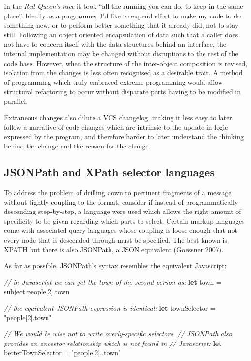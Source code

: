 \documentclass[12pt, ]{article}
\newenvironment{Shaded}{}{}
\newcommand{\KeywordTok}[1]{\textcolor[rgb]{0.00,0.44,0.13}{\textbf{{#1}}}}
\newcommand{\DecValTok}[1]{\textcolor[rgb]{0.25,0.63,0.44}{{#1}}}
\newcommand{\StringTok}[1]{\textcolor[rgb]{0.25,0.44,0.63}{{#1}}}
\newcommand{\CommentTok}[1]{\textcolor[rgb]{0.38,0.63,0.69}{\textit{{#1}}}}
\newcommand{\OtherTok}[1]{\textcolor[rgb]{0.00,0.44,0.13}{{#1}}}
\newcommand{\FunctionTok}[1]{\textcolor[rgb]{0.02,0.16,0.49}{{#1}}}
\newcommand{\NormalTok}[1]{{#1}}
\begin{document}
In the \emph{Red Queen's race} it took ``all the running you can do, to
keep in the same place''. Ideally as a programmer I'd like to expend
effort to make my code to do something new, or to perform better
something that it already did, not to stay still. Following an object
oriented encapsulation of data such that a caller does not have to
concern itself with the data structures behind an interface, the
internal implementation may be changed without disruptions to the rest
of the code base. However, when the structure of the inter-object
composition is revised, isolation from the changes is less often
recognised as a desirable trait. A method of programming which truly
embraced extreme programming would allow structural refactoring to occur
without disparate parts having to be modified in parallel.

Extraneous changes also dilute a VCS changelog, making it less easy to
later follow a narrative of code changes which are intrinsic to the
update in logic expressed by the program, and therefore harder to later
understand the thinking behind the change and the reason for the change.

\subsection{JSONPath and XPath selector
languages}\label{jsonpath-and-xpath-selector-languages}

\label{jsonpathxpath}

To address the problem of drilling down to pertinent fragments of a
message without tightly coupling to the format, consider if instead of
programmatically descending step-by-step, a language were used which
allows the right amount of specificity to be given regarding which parts
to select. Certain markup languages come with associated query languages
whose coupling is loose enough that not every node that is descended
through must be specified. The best known is XPATH but there is also
JSONPath, a JSON equivalent (Goessner 2007).

As far as possible, JSONPath's syntax resembles the equivalent
Javascript:

\begin{Shaded}
\begin{Highlighting}[]
\CommentTok{// in Javascript we can get the town of the second person as:}
\KeywordTok{let} \NormalTok{town = }\OtherTok{subject}\NormalTok{.}\FunctionTok{people}\NormalTok{[}\DecValTok{2}\NormalTok{].}\FunctionTok{town}

\CommentTok{// the equivalent JSONPath expression is identical:}
\KeywordTok{let} \NormalTok{townSelector = }\StringTok{"people[2].town"}

\CommentTok{// We would be wise not to write overly-specific selectors.}
\CommentTok{// JSONPath also provides an ancestor relationship which is not found in }
\CommentTok{// Javascript:}
\KeywordTok{let} \NormalTok{betterTownSelector = }\StringTok{"people[2]..town"}
\end{Highlighting}
\end{Shaded}
\end{document}
